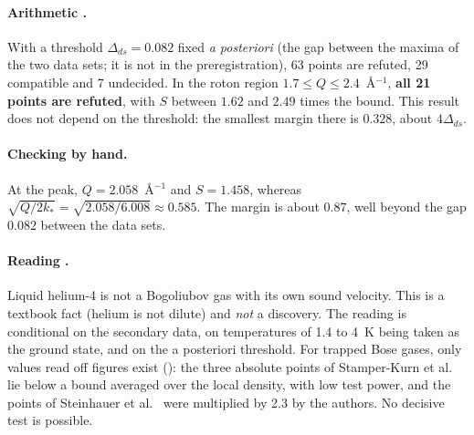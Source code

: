 \paragraph{Arithmetic \tierX.} With a threshold $\Delta_{ds}=0.082$ fixed \emph{a posteriori} (the gap between the
maxima of the two data sets; it is not in the preregistration), 63 points are refuted, 29 compatible and 7 undecided. In
the roton region $1.7\le Q\le2.4$~\AA$^{-1}$, \textbf{all 21 points are refuted}, with $S$ between $1.62$ and
$2.49$ times the bound. This result does not depend on the threshold: the smallest margin there is $0.328$, about
$4\Delta_{ds}$.

\paragraph{Checking by hand.} At the peak, $Q=2.058$~\AA$^{-1}$ and $S=1.458$, whereas
$\sqrt{Q/2k_*}=\sqrt{2.058/6.008}\approx0.585$. The margin is about $0.87$, well beyond the gap $0.082$
between the data sets.

\paragraph{Reading \tierC.} Liquid helium-4 is not a Bogoliubov gas with its own sound velocity. This is a textbook
fact (helium is not dilute) and \emph{not} a discovery. The reading is conditional on the secondary data,
on temperatures of 1.4 to 4~K being taken as the ground state, and on the a posteriori threshold. For trapped Bose gases,
only values read off figures exist (\tierX): the three absolute points of Stamper-Kurn et al.~\cite{ch3-sk}
lie below a bound averaged over the local density, with low test power, and the points of Steinhauer et
al.~\cite{ch3-st} were multiplied by 2.3 by the authors. No decisive test is possible.

